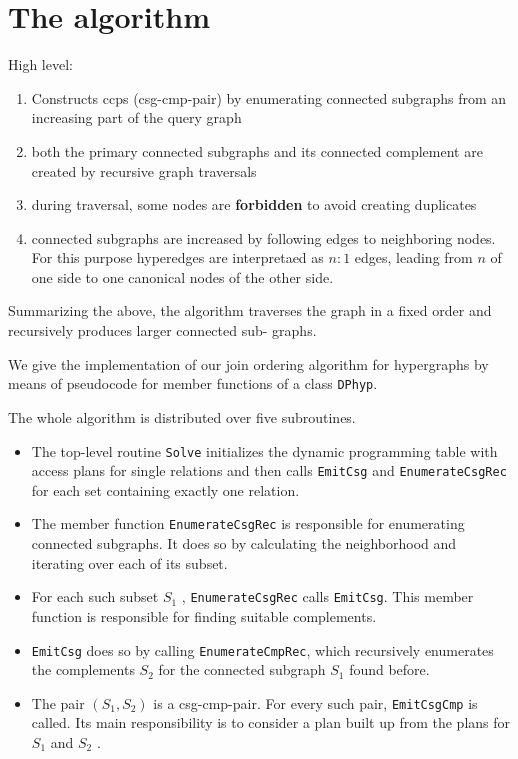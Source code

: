 \documentclass[11pt]{article}
\begin{document}
\section{The algorithm}
\label{sec:org017a573}
High level:
\begin{enumerate}
\item Constructs ccps (csg-cmp-pair) by enumerating connected subgraphs from an increasing part of the query graph
\item both the primary connected subgraphs and its connected complement are created by recursive graph traversals
\item during traversal, some nodes are \textbf{forbidden} to avoid creating duplicates
\item connected subgraphs are increased by following edges to neighboring nodes. For this purpose
hyperedges are interpretaed as \(n:1\) edges, leading from \(n\) of one side to one canonical nodes
of the other side.
\end{enumerate}

Summarizing the above, the algorithm traverses the graph in a fixed order and recursively produces
larger connected sub- graphs.

We give the implementation of our join ordering algorithm for hypergraphs by means of pseudocode for
member functions of a class \texttt{DPhyp}.

The whole algorithm is distributed over five subroutines.
\begin{itemize}
\item The top-level routine \texttt{Solve} initializes the dynamic programming table with access plans for single
relations and then calls \texttt{EmitCsg} and \texttt{EnumerateCsgRec} for each set containing exactly one relation.
\item The member function \texttt{EnumerateCsgRec} is responsible for enumerating connected subgraphs. It does so
by calculating the neighborhood and iterating over each of its subset.
\item For each such subset \(S_1\) , \texttt{EnumerateCsgRec} calls \texttt{EmitCsg}. This member function is responsible
for finding suitable complements.
\item \texttt{EmitCsg} does so by calling \texttt{EnumerateCmpRec}, which recursively enumerates the complements \(S_2\) for
the connected subgraph \(S_1\) found before.
\item The pair \((S_1,S_2)\) is a csg-cmp-pair. For every such pair, \texttt{EmitCsgCmp} is called. Its main
responsibility is to consider a plan built up from the plans for \(S_1\) and \(S_2\) .
\end{itemize}
\end{document}
